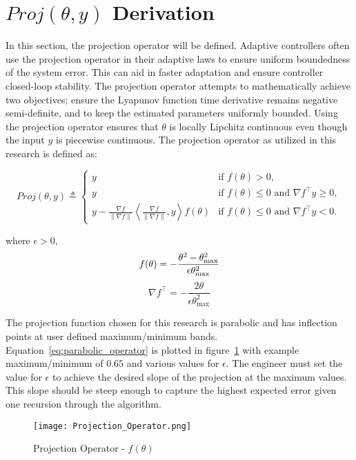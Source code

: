 \label{appendix:projection_derivation}
\section{$Proj(\theta,y)$ Derivation}

In this section, the projection operator will be defined.  Adaptive controllers often use the projection operator in their adaptive laws to ensure uniform boundedness of the system error.  This can aid in faster adaptation and ensure controller closed-loop stability.  The projection operator attempts to mathematically achieve two objectives; ensure the Lyapunov function time derivative remains negative semi-definite, and to keep the estimated parameters uniformly bounded.  Using the projection operator ensures that $\theta$ is locally Lipchitz continuous even though the input $y$ is piecewise continuous.  The projection operator as utilized in this research is defined as:

\begin{equation}
Proj(\theta,y)\triangleq 	
	\begin{cases}
	y& \text{if }f(\theta)>0, \\
	y& \text{if }f(\theta) \leq 0\text{ and }\nabla f^\top y\geq 0,\\
	y-\frac{\nabla f}{\|\nabla f\|}\left\langle\frac{\nabla f}{\|\nabla f\|},y\right\rangle f(\theta)& \text{if }f(\theta)\leq 0\text{ and }\nabla f^\top y< 0.
	\end{cases}	
\end{equation}

where $\epsilon>0$,
\begin{equation}\label{eq:parabolic_operator}
	f(\theta)=-\frac{\theta^2-\theta_{\text{max}}^2}{\epsilon \theta_{\text{max}}^2}\\
\end{equation}
\begin{equation}
	\nabla f^\top=-\frac{2\theta}{\epsilon \theta_{\text{max}}^2}
\end{equation}

The projection function chosen for this research is parabolic and has inflection points at user defined maximum/minimum bands.  Equation~\ref{eq:parabolic_operator} is plotted in figure~\ref{fig:projection_operator} with example maximum/minimum of $0.65$ and various values for $\epsilon$.  The engineer must set the value for $\epsilon$ to achieve the desired slope of the projection at the maximum values.  This slope should be steep enough to capture the highest expected error given one recursion through the algorithm.
\begin{figure}[h!]
 \centering
  \texttt{[image: Projection\_Operator.png]}
  \caption{Projection Operator - $f(\theta)$}
  \label{fig:projection_operator}
\end{figure}

